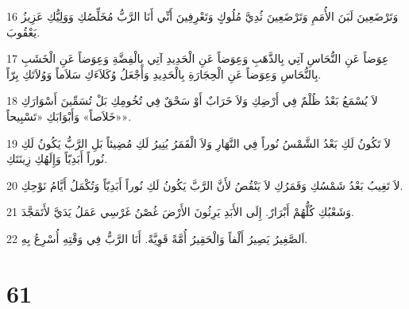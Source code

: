 \par 16 وَتَرْضَعِينَ لَبَنَ الأُمَمِ وَتَرْضَعِينَ ثُدِيَّ مُلُوكٍ وَتَعْرِفِينَ أَنِّي أَنَا الرَّبُّ مُخَلِّصُكِ وَوَلِيُّكِ عَزِيزُ يَعْقُوبَ.
\par 17 عِوَضاً عَنِ النُّحَاسِ آتِي بِالذَّهَبِ وَعِوَضاً عَنِ الْحَدِيدِ آتِي بِالْفِضَّةِ وَعِوَضاً عَنِ الْخَشَبِ بِالنُّحَاسِ وَعِوَضاً عَنِ الْحِجَارَةِ بِالْحَدِيدِ وَأَجْعَلُ وُكَلاَءَكِ سَلاَماً وَوُلاَتَكِ بِرّاً.
\par 18 لاَ يُسْمَعُ بَعْدُ ظُلْمٌ فِي أَرْضِكِ وَلاَ خَرَابٌ أَوْ سَحْقٌ فِي تُخُومِكِ بَلْ تُسَمِّينَ أَسْوَارَكِ «خَلاَصاً» وَأَبْوَابَكِ «تَسْبِيحاً».
\par 19 لاَ تَكُونُ لَكِ بَعْدُ الشَّمْسُ نُوراً فِي النَّهَارِ وَلاَ الْقَمَرُ يُنِيرُ لَكِ مُضِيئاً بَلِ الرَّبُّ يَكُونُ لَكِ نُوراً أَبَدِيّاً وَإِلَهُكِ زِينَتَكِ.
\par 20 لاَ تَغِيبُ بَعْدُ شَمْسُكِ وَقَمَرُكِ لاَ يَنْقُصُ لأَنَّ الرَّبَّ يَكُونُ لَكِ نُوراً أَبَدِيّاً وَتُكْمَلُ أَيَّامُ نَوْحِكِ.
\par 21 وَشَعْبُكِ كُلُّهُمْ أَبْرَارٌ. إِلَى الأَبَدِ يَرِثُونَ الأَرْضَ غُصْنُ غَرْسِي عَمَلُ يَدَيَّ لأَتَمَجَّدَ.
\par 22 اَلصَّغِيرُ يَصِيرُ أَلْفاً وَالْحَقِيرُ أُمَّةً قَوِيَّةً. أَنَا الرَّبُّ فِي وَقْتِهِ أُسْرِعُ بِهِ.

\chapter{61}

